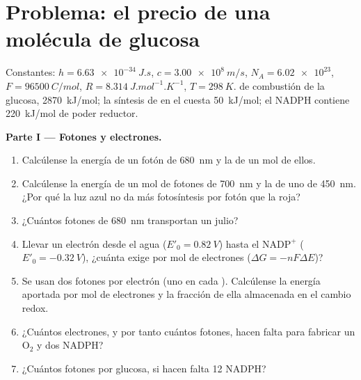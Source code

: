 \section{Problema: el precio de una molécula de glucosa}

\begin{problem}
\label{pb:b1:photosynthesis:1}
Constantes: $h = \qty{6.63e-34}{J.s}$, $c = \qty{3.00e8}{m/s}$,
$N_A = \num{6.02e23}$, $F = \qty{96500}{C/mol}$, $R = \qty{8.314}{J.mol^{-1}.K^{-1}}$,
$T = \qty{298}{K}$.  de combustión de la glucosa,
\qty{2870}{kJ/mol}; la síntesis de  en el  cuesta
\qty{50}{kJ/mol}; el NADPH contiene \qty{220}{kJ/mol} de poder reductor.

\medskip
\noindent\textbf{Parte I --- Fotones y electrones.}
\begin{enumerate}
  \item Calcúlense la energía de un fotón de \qty{680}{nm} y la de un mol
        de ellos.
  \item Calcúlense la energía de un mol de fotones de \qty{700}{nm} y la de
        uno de \qty{450}{nm}. ¿Por qué la luz azul no da más fotosíntesis
        por fotón que la roja?
  \item ¿Cuántos fotones de \qty{680}{nm} transportan un julio?
  \item Llevar un electrón desde el agua ($E'_0 = \qty{+0.82}{V}$) hasta el
        $\mathrm{NADP^+}$ ($E'_0 = \qty{-0.32}{V}$), ¿cuánta 
        exige por mol de electrones ($\Delta G = -nF\Delta E$)?
  \item Se usan dos fotones por electrón (uno en cada ).
        Calcúlense la energía aportada por mol de electrones y la fracción
        de ella almacenada en el cambio redox.
  \item ¿Cuántos electrones, y por tanto cuántos fotones, hacen falta para
        fabricar un $\mathrm{O_2}$ y dos NADPH?
  \item ¿Cuántos fotones por glucosa, si hacen falta 12 NADPH?
\end{enumerate}


\end{problem}
